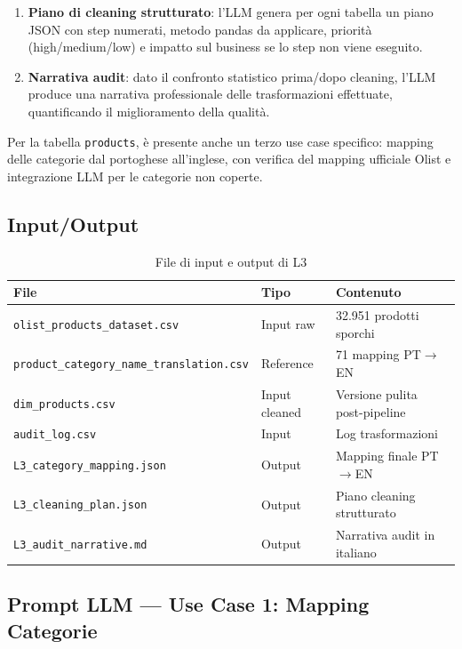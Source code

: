 \documentclass[12pt,a4paper]{article}
\begin{document}
\begin{enumerate}
  \item \textbf{Piano di cleaning strutturato}: l'LLM genera per ogni tabella
        un piano JSON con step numerati, metodo pandas da applicare, priorità
        (high/medium/low) e impatto sul business se lo step non viene eseguito.
  \item \textbf{Narrativa audit}: dato il confronto statistico prima/dopo
        cleaning, l'LLM produce una narrativa professionale delle trasformazioni
        effettuate, quantificando il miglioramento della qualità.
\end{enumerate}

Per la tabella \texttt{products}, è presente anche un terzo use case specifico:
mapping delle categorie dal portoghese all'inglese, con verifica del mapping
ufficiale Olist e integrazione LLM per le categorie non coperte.

\subsection{Input/Output}

\begin{table}[H]
  \centering
  \begin{tabular}{lll}
    \toprule
    \textbf{File} & \textbf{Tipo} & \textbf{Contenuto} \\
    \midrule
    \texttt{olist\_products\_dataset.csv} & Input raw & 32.951 prodotti sporchi \\
    \texttt{product\_category\_name\_translation.csv} & Reference & 71 mapping PT$\to$EN \\
    \texttt{dim\_products.csv} & Input cleaned & Versione pulita post-pipeline \\
    \texttt{audit\_log.csv} & Input & Log trasformazioni \\
    \texttt{L3\_category\_mapping.json} & Output & Mapping finale PT$\to$EN \\
    \texttt{L3\_cleaning\_plan.json} & Output & Piano cleaning strutturato \\
    \texttt{L3\_audit\_narrative.md} & Output & Narrativa audit in italiano \\
    \bottomrule
  \end{tabular}
  \caption{File di input e output di L3}
\end{table}

\subsection{Prompt LLM — Use Case 1: Mapping Categorie}
\end{document}
